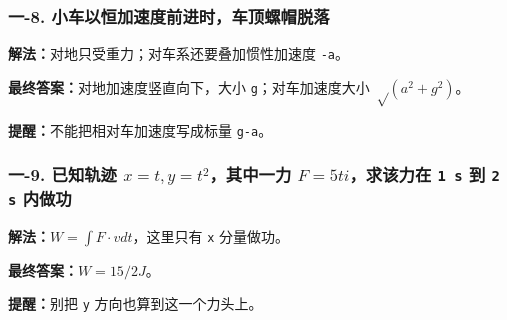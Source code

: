 \documentclass[12pt,a4paper]{ctexart}
\begin{document}
\subsubsection*{一-8. 小车以恒加速度前进时，车顶螺帽脱落}
\begin{tcolorbox}[colback=gray!2!white,colframe=black!60,title={题目}]

\end{tcolorbox}
\begin{tcolorbox}[colback=blue!2!white,colframe=blue!55!black,title={完整答案}]
\textbf{解法：}对地只受重力；对车系还要叠加惯性加速度 \texttt{-a}。\par
\textbf{最终答案：}对地加速度竖直向下，大小 \texttt{g}；对车加速度大小 \(√(a^2+g^2)\)。\par

\end{tcolorbox}
\begin{tcolorbox}[colback=red!2!white,colframe=red!55!black,title={易错点}]
\textbf{提醒：}不能把相对车加速度写成标量 \texttt{g-a}。\par
\end{tcolorbox}

\subsubsection*{一-9. 已知轨迹 \(x=t, y=t^2\)，其中一力 \(F=5t i\)，求该力在 \texttt{1 s} 到 \texttt{2 s} 内做功}
\begin{tcolorbox}[colback=gray!2!white,colframe=black!60,title={题目}]

\end{tcolorbox}
\begin{tcolorbox}[colback=blue!2!white,colframe=blue!55!black,title={完整答案}]
\textbf{解法：}\(W=∫F·v dt\)，这里只有 \texttt{x} 分量做功。\par
\textbf{最终答案：}\(W=15/2 J\)。\par

\end{tcolorbox}
\begin{tcolorbox}[colback=red!2!white,colframe=red!55!black,title={易错点}]
\textbf{提醒：}别把 \texttt{y} 方向也算到这一个力头上。\par
\end{tcolorbox}
\end{document}
